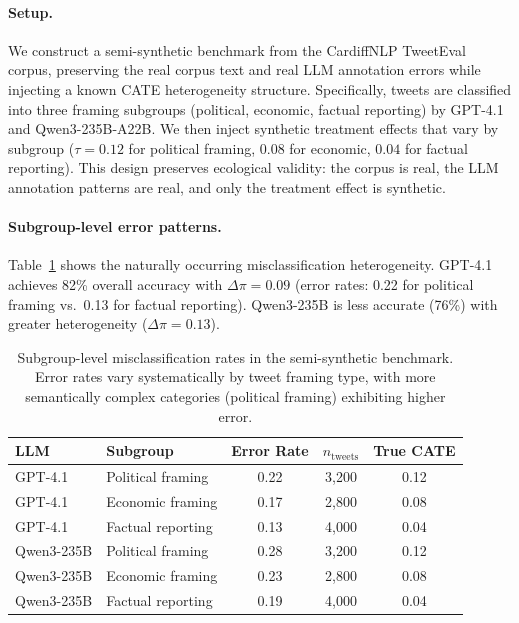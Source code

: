 \documentclass[11pt,a4paper]{article}
\begin{document}
\paragraph{Setup.}
We construct a semi-synthetic benchmark from the CardiffNLP TweetEval corpus, preserving the real corpus text and real LLM annotation errors while injecting a known CATE heterogeneity structure.
Specifically, tweets are classified into three framing subgroups (political, economic, factual reporting) by GPT-4.1 and Qwen3-235B-A22B.
We then inject synthetic treatment effects that vary by subgroup ($\tau = 0.12$ for political framing, $0.08$ for economic, $0.04$ for factual reporting).
This design preserves ecological validity: the corpus is real, the LLM annotation patterns are real, and only the treatment effect is synthetic.

\paragraph{Subgroup-level error patterns.}
Table~\ref{tab:subgroup_error} shows the naturally occurring misclassification heterogeneity.
GPT-4.1 achieves 82\% overall accuracy with $\Delta\pi = 0.09$ (error rates: 0.22 for political framing vs.\ 0.13 for factual reporting).
Qwen3-235B is less accurate (76\%) with greater heterogeneity ($\Delta\pi = 0.13$).

\begin{table}[t]
\centering
\small
\caption{Subgroup-level misclassification rates in the semi-synthetic benchmark. Error rates vary systematically by tweet framing type, with more semantically complex categories (political framing) exhibiting higher error.}
\label{tab:subgroup_error}
\begin{tabular}{llccc}
\toprule
LLM & Subgroup & Error Rate & $n_{\text{tweets}}$ & True CATE \\
\midrule
GPT-4.1 & Political framing & 0.22 & 3{,}200 & 0.12 \\
GPT-4.1 & Economic framing & 0.17 & 2{,}800 & 0.08 \\
GPT-4.1 & Factual reporting & 0.13 & 4{,}000 & 0.04 \\
\midrule
Qwen3-235B & Political framing & 0.28 & 3{,}200 & 0.12 \\
Qwen3-235B & Economic framing & 0.23 & 2{,}800 & 0.08 \\
Qwen3-235B & Factual reporting & 0.19 & 4{,}000 & 0.04 \\
\bottomrule
\end{tabular}
\end{table}
\end{document}
